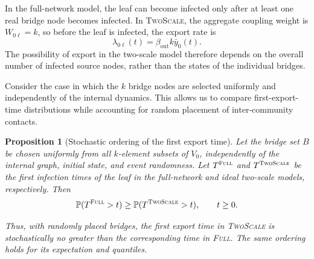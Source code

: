 \documentclass[a4paper,fleqn]{cas-sc}
\newtheorem{proposition}{Proposition}
\newcommand{\ibar}{\bar{y}}
\newcommand{\Full}{\textup{\textsc{Full}}}
\newcommand{\TS}{\textup{\textsc{TwoScale}}}
\begin{document}
In the full-network model, the leaf can become infected only after at least one real bridge node becomes infected. In \TS{}, the aggregate coupling weight is $W_{0\ell}=k$, so before the leaf is infected, the export rate is
\[
\lambda_{0\ell}(t)
=
\beta_{\mathrm{out}}k\ibar_0(t).
\]
The possibility of export in the two-scale model therefore depends on the overall number of infected source nodes, rather than the states of the individual bridges.

Consider the case in which the $k$ bridge nodes are selected uniformly and independently of the internal dynamics. This allows us to compare first-export-time distributions while accounting for random placement of inter-community contacts.

\begin{proposition}[Stochastic ordering of the first export time]
\label{prop:ordering}
Let the bridge set $B$ be chosen uniformly from all $k$-element subsets of $V_0$, independently of the internal graph, initial state, and event randomness. Let $T^{\Full}$ and $T^{\TS}$ be the first infection times of the leaf in the full-network and ideal two-scale models, respectively. Then
\[
\mathbb{P}(T^{\Full}>t)
\geq
\mathbb{P}(T^{\TS}>t),
\qquad t\geq 0.
\]

Thus, with randomly placed bridges, the first export time in \TS{} is stochastically no greater than the corresponding time in \Full{}. The same ordering holds for its expectation and quantiles.
\end{proposition}
\end{document}
